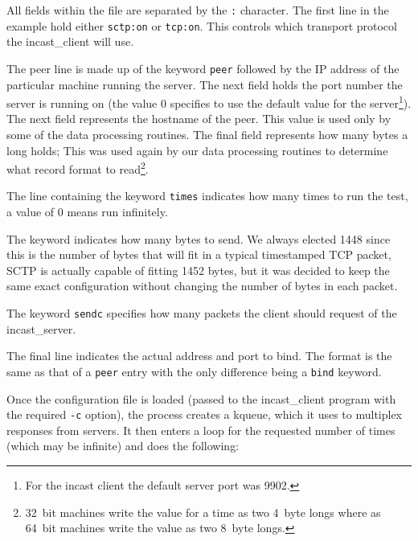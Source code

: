 \documentclass[12pt]{article}
\begin{document}
All fields within the file are separated by the \texttt{:} character.
The first line in the example hold either \texttt{sctp:on} or \texttt{tcp:on}. This controls which transport protocol
the incast\_client will use. 

The peer line is made up of the keyword \texttt{peer} followed by the IP address of the particular
machine running the server. The next field holds the port  number the server is
running on (the value 0 specifies to use the default value for the server\footnote{For the incast
client the default server port was 9902.}). The next field represents the hostname of the peer. This value 
is used only by some of the data processing routines. The final field represents how many bytes a
long holds; This was used again by our data processing routines to determine what record format
to read\footnote{32~bit machines write the value for a time as two 4~byte longs where as 64~bit machines
write the value as two 8~byte longs.}.

The line containing the keyword \texttt{times} indicates how many times to run the test, a value of 0
means run infinitely.

The keyword  indicates how many bytes to send. We always elected 1448 since this is
the number of bytes that will fit in a typical timestamped TCP packet, SCTP is actually capable
of fitting 1452 bytes, but it was decided to keep the same exact configuration without changing
the number of bytes in each packet.

The keyword \texttt{sendc} specifies how many packets the client should request of the incast\_server.

The final line indicates the actual address and port to bind. The format is the same as that
of a \texttt{peer} entry with the only difference being a \texttt{bind} keyword.

Once the configuration file is loaded (passed to the incast\_client program with the required
\texttt{-c} option), the process creates a kqueue, which it uses to multiplex responses from
servers. It then enters a loop for the requested number of times (which may be infinite) and
does the following:

\end{document}
